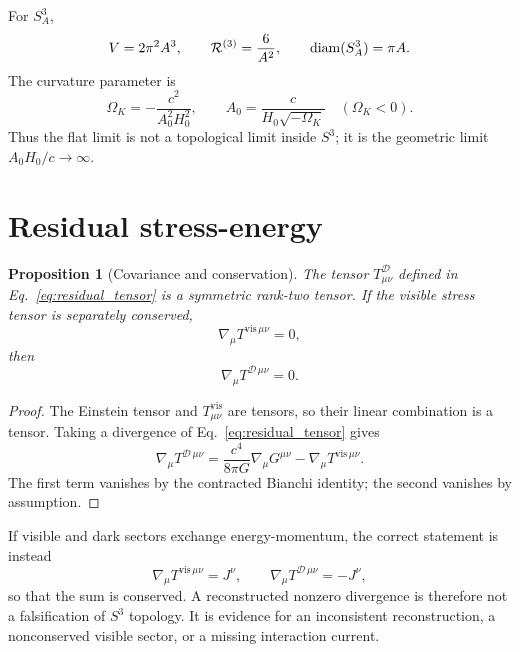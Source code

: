 \documentclass[
  aps,
  prd,
  reprint,
  superscriptaddress,
  nofootinbib,
  floatfix,
  longbibliography
]{revtex4-2}
\newtheorem{proposition}{Proposition}
\newcommand{\D}{\mathcal D}
\newcommand{\vis}{\mathrm{vis}}
\begin{document}
For \(S^3_A\),
\begin{equation}
  V=2\pi^2A^3,\qquad
  {\cal R}^{(3)}=\frac{6}{A^2},\qquad
  \operatorname{diam}(S^3_A)=\pi A .
  \label{eq:s3_geometry}
\end{equation}
The curvature parameter is
\begin{equation}
  \Omega_K=-\frac{c^2}{A_0^2H_0^2},
  \qquad
  A_0=\frac{c}{H_0\sqrt{-\Omega_K}}
  \quad(\Omega_K<0).
  \label{eq:omegaK_radius}
\end{equation}
Thus the flat limit is not a topological limit inside \(S^3\); it is
the geometric limit \(A_0H_0/c\to\infty\).

\section{Residual stress-energy}
\label{sec:residual}

\begin{proposition}[Covariance and conservation]
The tensor \(T^\D_{\mu\nu}\) defined in Eq.~\eqref{eq:residual_tensor}
is a symmetric rank-two tensor.  If the visible stress tensor is
separately conserved,
\begin{equation}
  \nabla_\mu T^{\vis\,\mu\nu}=0,
  \label{eq:visible_conserved}
\end{equation}
then
\begin{equation}
  \nabla_\mu T^{\D\,\mu\nu}=0 .
  \label{eq:dark_conserved}
\end{equation}
\end{proposition}

\begin{proof}
The Einstein tensor and \(T^{\vis}_{\mu\nu}\) are tensors, so their
linear combination is a tensor.  Taking a divergence of
Eq.~\eqref{eq:residual_tensor} gives
\begin{equation}
  \nabla_\mu T^{\D\,\mu\nu}
  =\frac{c^4}{8\pi G}\nabla_\mu G^{\mu\nu}
  -\nabla_\mu T^{\vis\,\mu\nu}.
\end{equation}
The first term vanishes by the contracted Bianchi identity; the second
vanishes by assumption.
\end{proof}

If visible and dark sectors exchange energy-momentum, the correct
statement is instead
\begin{equation}
  \nabla_\mu T^{\vis\,\mu\nu}=J^\nu,\qquad
  \nabla_\mu T^{\D\,\mu\nu}=-J^\nu ,
  \label{eq:interaction_current}
\end{equation}
so that the sum is conserved.  A reconstructed nonzero divergence is
therefore not a falsification of \(S^3\) topology.  It is evidence for
an inconsistent reconstruction, a nonconserved visible sector, or a
missing interaction current.
\end{document}

